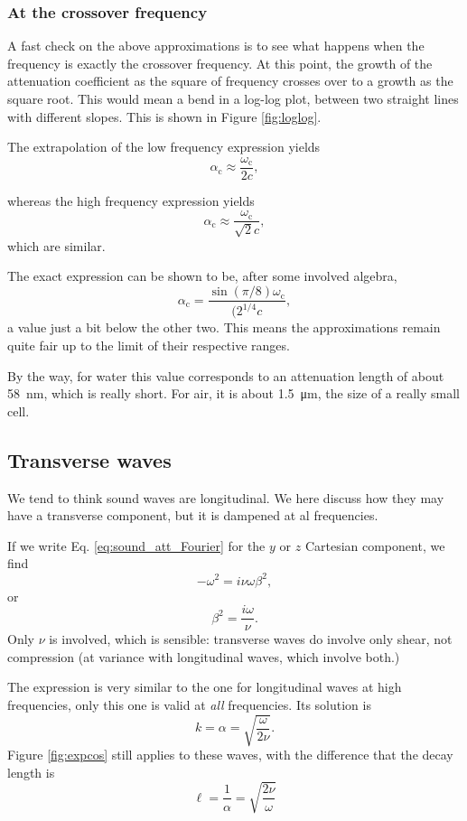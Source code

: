 \subsubsection{At the crossover frequency}


A fast check on the above approximations is to see what happens when
the frequency is exactly the crossover frequency. At this point, the
growth of the attenuation coefficient as the square of frequency
crosses over to a growth as the square root. This would mean a bend in
a log-log plot, between two straight lines with different slopes. This
is shown in Figure \ref{fig:loglog}.

The extrapolation of the low frequency expression yields
\[
\alpha_\mathrm{c}\approx \frac{\omega_\mathrm{c}}{2 c} ,
\]

whereas the high frequency expression yields
\[
\alpha_\mathrm{c}\approx \frac{\omega_\mathrm{c}}{\sqrt{2} c} ,
\]
which are similar.

The exact expression can be shown to be, after some involved algebra,
\[
\alpha_\mathrm{c} =\frac{ \sin(\pi/8) \omega_\mathrm{c} }{ (2^{1/4} c } ,
\]
a value just a bit below the other two. This means the approximations
remain quite fair up to the limit of their respective ranges.

By the way, for water this value corresponds to an attenuation length
of about \SI{58}{\nano\meter}, which is really short. For air, it is
about \SI{1.5}{\micro\meter}, the size of a really small cell.


\subsection{Transverse waves}

We tend to think sound waves are longitudinal. We here discuss how
they may have a transverse component, but it is dampened at al
frequencies.

If we write Eq. \ref{eq:sound_att_Fourier} for the $y$ or $z$
Cartesian component, we find
\[
-\omega^2 =  i \nu \omega \beta^2 ,
\]
or
\[
\beta^2 = \frac{i \omega}{\nu}.
\]
Only $\nu$ is involved, which is sensible: transverse waves do involve
only shear, not compression (at variance with longitudinal waves,
which involve both.)

The expression is very similar to the one for longitudinal waves at
high frequencies, only this one is valid at \emph{all} frequencies.
Its solution is
\[
k = \alpha = \sqrt{ \frac{\omega}{ 2 \nu}}.
\]
Figure \ref{fig:expcos} still applies to these waves, with the
difference that the decay length is
\[
\ell= \frac{1}{\alpha}=\sqrt{\frac{ 2 \nu}{\omega}}
\]

